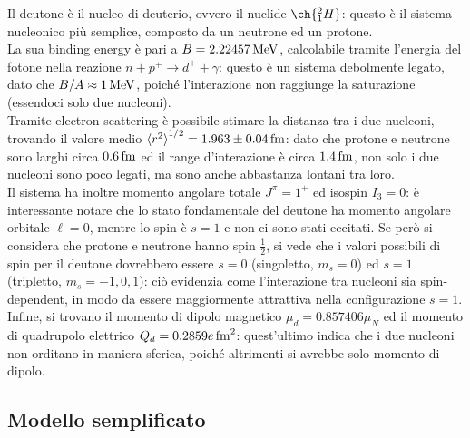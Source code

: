 Il deutone è il nucleo di deuterio, ovvero il nuclide $ \ch{^2_1 H} $: questo è il sistema nucleonico più semplice, composto da un neutrone ed un protone.\\
La sua binding energy è pari a $ B = 2.22457\,\mathrm{MeV} $, calcolabile tramite l'energia del fotone nella reazione $ n + p^+ \rightarrow d^+ + \gamma $: questo è un sistema debolmente legato, dato che $ B / A \approx 1 \,\mathrm{MeV} $, poiché l'interazione non raggiunge la saturazione (essendoci solo due nucleoni).\\
Tramite electron scattering è possibile stimare la distanza tra i due nucleoni, trovando il valore medio $ \braket{r^2}^{1/2} = 1.963 \pm 0.04 \,\mathrm{fm} $: dato che protone e neutrone sono larghi circa $ 0.6\,\mathrm{fm} $ ed il range d'interazione è circa $ 1.4\,\mathrm{fm} $, non solo i due nucleoni sono poco legati, ma sono anche abbastanza lontani tra loro.\\
Il sistema ha inoltre momento angolare totale $ J^{\pi} = 1^+ $ ed isospin $ I_3 = 0 $: è interessante notare che lo stato fondamentale del deutone ha momento angolare orbitale $ \ell = 0 $, mentre lo spin è $ s = 1 $ e non ci sono stati eccitati. Se però si considera che protone e neutrone hanno spin $ \frac{1}{2} $, si vede che i valori possibili di spin per il deutone dovrebbero essere $ s = 0 $ (singoletto, $ m_s = 0 $) ed $ s = 1 $ (tripletto, $ m_s = -1,0,1 $): ciò evidenzia come l'interazione tra nucleoni sia spin-dependent, in modo da essere maggiormente attrattiva nella configurazione $ s = 1 $.\\
Infine, si trovano il momento di dipolo magnetico $ \mu_d = 0.857406 \mu_N $ ed il momento di quadrupolo elettrico $ Q_d = 0.2859 e \,\mathrm{fm}^2 $: quest'ultimo indica che i due nucleoni non orditano in maniera sferica, poiché altrimenti si avrebbe solo momento di dipolo.

\subsection{Modello semplificato}

